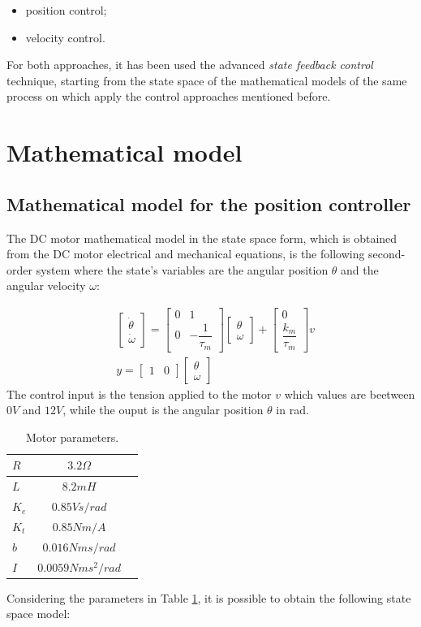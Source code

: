 \documentclass[11pt,a4paper,oneside]{extarticle}
\newcommand\mtrx[1]{
    \begin{bmatrix}
        #1
    \end{bmatrix}
}
\begin{document}
\begin{itemize}
	\item position control;
	\item velocity control.
\end{itemize}

For both approaches, it has been used the advanced 
\textit{state feedback control} technique, starting from the state 
space of the mathematical models of the same process on which apply 
the control approaches mentioned before.

\section{Mathematical model}
\subsection{Mathematical model for the position controller}
The DC motor mathematical model in the state space form, which is 
obtained from the DC motor electrical and mechanical equations, is the
following second-order system where the state's variables are the 
angular position $\theta$ and the angular velocity $\omega$:

\begin{equation}
	\begin{split}
		&\mtrx{\dot{\theta}\\ \dot{\omega}}= \mtrx{0 & 1\\ 0 
		& -\dfrac{1}{\tau_m}}\mtrx{\theta\\ \omega} + \mtrx{0\\ 
		\dfrac{k_m}{\tau_m}}v\\ &y = \mtrx{1 & 0}\mtrx{\theta\\ 
		\omega}
	\end{split}
\end{equation}
The control input is the tension applied to the motor $v$ 
which values are beetween $0V$ and $12V$, while the ouput is the
angular position $\theta$ in rad.

\begin{table}[H]
	\centering
	\begin{tabular}{|l|c|l|}
		\hline
		$R$   & $3.2\Omega$       \\ \hline
		$L$   & $8.2mH$           \\ \hline
		$K_e$ & $0.85Vs/rad$      \\ \hline
		$K_t$ & $0.85Nm/A$        \\ \hline
		$b$   & $0.016Nms/rad$    \\ \hline
		$I$   & $0.0059Nms^2/rad$ \\ \hline
	\end{tabular}
	\caption{Motor parameters.}
	\label{tab:motor_parameters}
\end{table}
Considering the parameters in Table \ref{tab:motor_parameters}, it is
possible to obtain the following state space model:
\end{document}
